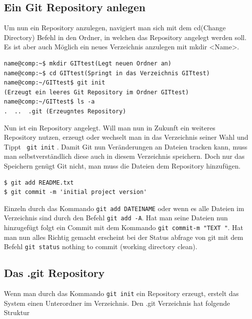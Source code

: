 \documentclass[12pt,a4paper,bibliography=totocnumbered,listof=totocnumbered]{scrartcl}
\begin{document}
\subsection{Ein Git Repository anlegen}
Um nun ein Repository anzulegen, navigiert man sich mit dem cd(Change Directory) Befehl in den Ordner, in welchen das Repository angelegt werden soll. Es ist aber auch Möglich ein neues Verzeichnis anzulegen mit mkdir <Name>. 

\vspace{1em}
\begin{lstlisting}[caption=Git Repository anlegen, label=lst:arduino]
name@comp:~$ mkdir GITtest(Legt neuen Ordner an)
name@comp:~$ cd GITtest(Springt in das Verzeichnis GITtest)
name@comp:~/GITtest$ git init 
(Erzeugt ein leeres Git Repository im Ordner GITtest)
name@comp:~/GITtest$ ls -a
.  ..  .git (Erzeugntes Repository)

\end{lstlisting}

Nun ist ein Repository angelegt.
Will man nun in Zukunft ein weiteres Repository nutzen, erzeugt oder wechselt man in das Verzeichnis seiner Wahl und Tippt  \lstinline| git init| . Damit Git nun Veränderungen an Dateien tracken kann, muss man selbstverständlich diese auch in diesem Verzeichnis speichern. Doch nur das Speichern genügt Git nicht, man muss die Dateien dem Repository hinzufügen. 

 \vspace{1em}
\begin{lstlisting}[caption=Git Repository Dateien hinzufügen, label=lst:arduino]
$ git add README.txt
$ git commit -m 'initial project version'

\end{lstlisting}


Einzeln durch das Kommando \lstinline|git add DATEINAME| oder wenn es alle Dateien im Verzeichnis sind durch den Befehl \lstinline|git add -A|. Hat man seine Dateien nun hinzugefügt folgt ein Commit mit dem Kommando \lstinline|git commit-m "TEXT "|. Hat man nun alles Richtig gemacht erscheint bei der Status abfrage von git mit dem Befehl \lstinline|git status| nothing to commit (working directory clean).

\subsection{Das .git Repository}
Wenn man durch das Kommando \lstinline|git init|	ein Repository erzeugt, erstelt das System einen Unterordner im Verzeichnis. Den .git Verzeichnis hat folgende Struktur
\end{document}
